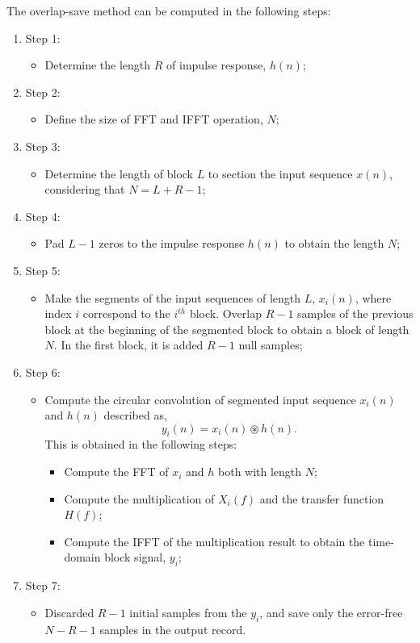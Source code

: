 The overlap-save method can be computed in the following steps:
\begin{enumerate}
    \item   Step 1:
    \begin{itemize}
        \item   Determine the length $R$ of impulse response, $h(n)$;
    \end{itemize}
    \item   Step 2:
    \begin{itemize}
        \item   Define the size of FFT and IFFT operation, $N$;
    \end{itemize}
    \item   Step 3:
    \begin{itemize}
        \item   Determine the length of block $L$ to section the input sequence $x(n)$, considering that $N=L+R-1$;
    \end{itemize}
    \item   Step 4:
    \begin{itemize}
        \item   Pad $L-1$ zeros to the impulse response $h(n)$ to obtain the length $N$;
    \end{itemize}
    \item   Step 5:
    \begin{itemize}
        \item   Make the segments of the input sequences of length $L$, $x_i(n)$, where index $i$ correspond to the $i^{th}$ block. Overlap $R-1$ samples of the previous block at the beginning of the segmented block to obtain a block of length $N$. In the first block, it is added $R-1$ null samples;
    \end{itemize}
    \item   Step 6:
    \begin{itemize}
        \item   Compute the circular convolution of segmented input sequence $x_i(n)$ and $h(n)$ described as,
        \begin{equation}
            y_i(n)= x_i(n) \circledast h(n).
            \label{genFIR}
        \end{equation}
        This is obtained in the following steps:
        \begin{itemize}
            \item   Compute the FFT of $x_i$ and $h$ both with length $N$;
            \item   Compute the multiplication of $X_i(f)$ and the transfer function $H(f)$;
            \item   Compute the IFFT of the multiplication result to obtain the time-domain block signal, $y_i$;
        \end{itemize}
    \end{itemize}
    \item   Step 7:
    \begin{itemize}
        \item   Discarded $R-1$ initial samples from the $y_i$, and save only the error-free $N-R-1$ samples in the output record.
    \end{itemize}
\end{enumerate}
